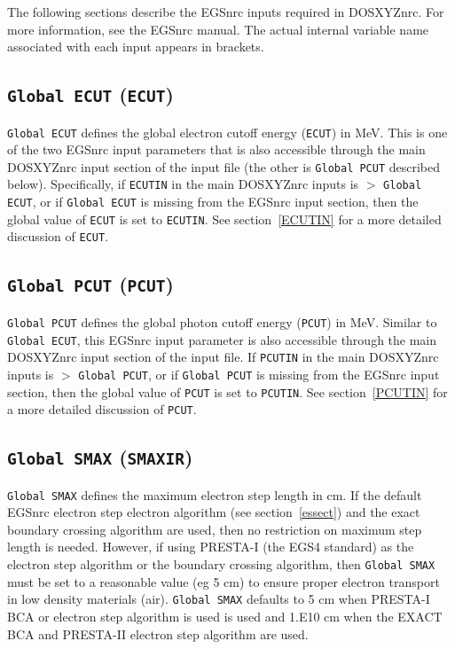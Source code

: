 \documentclass[12pt,twoside]{article}      %
\begin{document}
The following sections describe the EGSnrc inputs required in
DOSXYZnrc.  For more information, see the EGSnrc manual\cite{KR00}. The
actual internal variable name associated with each input appears in brackets.

\subsection{ {\tt Global ECUT} ({\tt ECUT})}

{\tt Global ECUT} defines the global electron cutoff energy ({\tt ECUT})
in MeV.
This is one of the two EGSnrc input parameters that is also accessible
through the main DOSXYZnrc input section of the input file (the other
is {\tt Global PCUT} described below).  Specifically, if {\tt ECUTIN}
in the main
DOSXYZnrc inputs is $>$ {\tt Global ECUT}, or if {\tt Global ECUT} is
missing from the EGSnrc input section, then the global value of
{\tt ECUT} is set to {\tt ECUTIN}.  See section~\ref{ECUTIN} for a more
detailed discussion of {\tt ECUT}.

\subsection{ {\tt Global PCUT} ({\tt PCUT})}

{\tt Global PCUT} defines the global photon cutoff energy ({\tt PCUT})
in MeV.
Similar to {\tt Global ECUT}, this EGSnrc input parameter is also accessible
through the main DOSXYZnrc input section of the input file.
If {\tt PCUTIN} in the main
DOSXYZnrc inputs is $>$ {\tt Global PCUT}, or if {\tt Global PCUT} is
missing from the EGSnrc input section, then the global value of
{\tt PCUT} is set to {\tt PCUTIN}.  See section~\ref{PCUTIN} for a more
detailed discussion of {\tt PCUT}.

\subsection{{\tt Global SMAX} ({\tt SMAXIR})}
\label{smaxsect}

{\tt Global SMAX} defines the maximum electron step length in cm.  If the
default EGSnrc electron step electron algorithm (see
section~\ref{essect}) and the exact boundary crossing algorithm are used, then no
restriction on maximum step length is needed.  However, if using
PRESTA-I (the EGS4 standard) as the electron step algorithm or the boundary
crossing algorithm, then
{\tt Global SMAX} must be set to a reasonable value (eg 5 cm) to ensure
proper electron transport in low density materials (air).
{\tt Global SMAX} defaults to 5 cm when PRESTA-I BCA or electron step
algorithm is used is used and 1.E10 cm
when the EXACT BCA and PRESTA-II electron step
algorithm are used.
\end{document}
